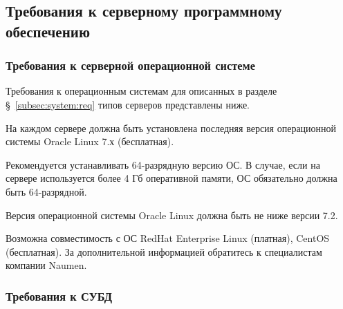 %
%
%
%
%
%
%
%
%

\subsection{Требования к серверному программному обеспечению}

\subsubsection{Требования к серверной операционной системе}

Требования к операционным системам для описанных в разделе \S~\ref{subsec:system:req} типов серверов представлены ниже.

На каждом сервере должна быть установлена последняя версия операционной системы Oracle Linux 7.х (бесплатная).

Рекомендуется устанавливать 64-разрядную версию ОС.
В случае, если на сервере используется более 4 Гб оперативной памяти, ОС обязательно должна быть 64-разрядной.

Версия операционной системы Oracle Linux должна быть не ниже версии 7.2.

Возможна совместимость с ОС RedHat Enterprise Linux (платная), CentOS (бесплатная).
За дополнительной информацией обратитесь к специалистам компании Naumen.

\subsubsection{Требования к СУБД}

